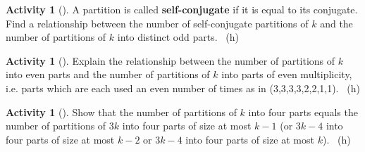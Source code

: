 \documentclass[10pt,]{book}
\newcommand{\terminology}[1]{\textbf{#1}}
\theoremstyle{plain}
\theoremstyle{definition}
\theoremstyle{definition}
\theoremstyle{definition}
\newtheorem{activity}[project]{Activity}
\numberwithin{equation}{chapter}
\begin{document}
\begin{activity}[]\label{activity-298}
\hypertarget{p-1506}{}%
A partition is called \terminology{self-conjugate} if it is equal to its conjugate. Find a relationship between the number of self-conjugate partitions of \(k\) and the number of partitions of \(k\) into distinct odd parts.%
~{\tiny (h)}\end{activity}
\begin{activity}[]\label{partition-even-mult-even-use}
\hypertarget{p-1510}{}%
Explain the relationship between the number of partitions of \(k\) into even parts and the number of partitions of \(k\) into parts of even multiplicity, i.e. parts which are each used an even number of times as in (3,3,3,3,2,2,1,1).%
~{\tiny (h)}\end{activity}
\begin{activity}[]\label{rectanglecomplement}
\hypertarget{p-1513}{}%
Show that the number of partitions of \(k\) into four parts equals the number of partitions of \(3k\) into four parts of size at most \(k-1\) (or \(3k-4\) into four parts of size at most \(k-2\) or \(3k-4\) into four parts of size at most \(k\)).%
~{\tiny (h)}\end{activity}
\end{document}
